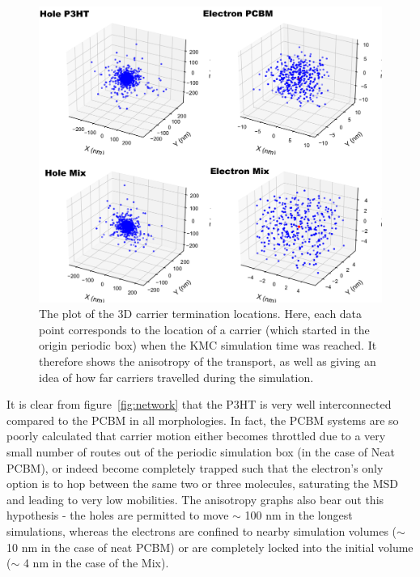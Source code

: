 \documentclass[12pt]{article}
\begin{document}
\begin{figure}[h!]\centering
	\includegraphics[width=\textwidth]{Figures/Anisotropy.pdf}
    \caption{The plot of the 3D carrier termination locations.
        Here, each data point corresponds to the location of a carrier (which started in the origin periodic box) when the KMC simulation time was reached.
    It therefore shows the anisotropy of the transport, as well as giving an idea of how far carriers travelled during the simulation.
    }
	\label{fig:anisotropy}
\end{figure}


It is clear from figure~\ref{fig:network} that the P3HT is very well interconnected compared to the PCBM in all morphologies.
In fact, the PCBM systems are so poorly calculated that carrier motion either becomes throttled due to a very small number of routes out of the periodic simulation box (in the case of Neat PCBM), or indeed become completely trapped such that the electron's only option is to hop between the same two or three molecules, saturating the MSD and leading to very low mobilities.
The anisotropy graphs also bear out this hypothesis - the holes are permitted to move $\sim$ 100 nm in the longest simulations, whereas the electrons are confined to nearby simulation volumes ($\sim$ 10 nm in the case of neat PCBM) or are completely locked into the initial volume ($\sim$ 4 nm in the case of the Mix).
\end{document}
